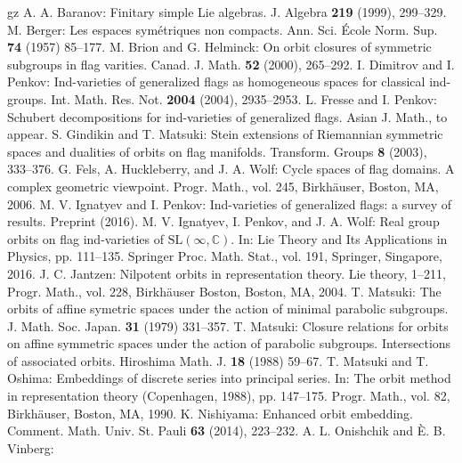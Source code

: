 \documentclass{amsart}
\theoremstyle{definition}
\begin{document}
\begin{thebibliography}{gz}
 A. A. Baranov: Finitary simple Lie algebras.  J. Algebra \textbf{219} (1999), 299--329.
 M. Berger: Les espaces sym\'etriques non compacts. Ann. Sci. \'Ecole Norm. Sup. \textbf{74} (1957) 85--177.
 M. Brion and G. Helminck: On orbit closures of symmetric subgroups in flag varities. Canad. J. Math. \textbf{52} (2000), 265--292.
 I. Dimitrov and I. Penkov: Ind-varieties of generalized flags as homogeneous spaces for classical ind-groups. Int. Math. Res. Not. \textbf{2004} (2004), 2935--2953.
 L. Fresse and I. Penkov: Schubert decompositions for ind-varieties of generalized flags. Asian J. Math., to appear.
 S. Gindikin and T. Matsuki: Stein extensions of Riemannian symmetric spaces and dualities of orbits on flag manifolds. Transform. Groups \textbf{8} (2003), 333--376.
 G. Fels, A. Huckleberry, and J. A. Wolf: Cycle spaces of flag domains. A complex geometric viewpoint. Progr. Math., vol. 245, Birkh\"auser, Boston, MA, 2006.
 M. V. Ignatyev and I. Penkov: Ind-varieties of generalized flags: a survey of results. Preprint (2016).
 M. V. Ignatyev, I. Penkov, and J. A. Wolf: Real group orbits on flag ind-varieties of $\mathrm{SL}(\infty,\mathbb{C})$. In: Lie Theory and Its Applications in Physics, pp. 111--135. Springer Proc. Math. Stat., vol. 191, Springer, Singapore, 2016.
  J. C. Jantzen: Nilpotent orbits in representation theory. Lie theory, 1--211, Progr. Math., vol. 228, Birkh\"auser Boston, Boston, MA, 2004. 
 T. Matsuki: The orbits of affine symetric spaces under the action of minimal parabolic
subgroups. J. Math. Soc. Japan. \textbf{31} (1979) 331--357.
 T. Matsuki: Closure relations for orbits on affine symmetric spaces under the action of parabolic subgroups. Intersections of associated orbits. Hiroshima Math. J. \textbf{18} (1988) 59--67.
 T. Matsuki and T. Oshima:
Embeddings of discrete series into principal series. 
In: The orbit method in representation theory (Copenhagen, 1988), pp. 147--175. 
Progr. Math., vol. 82, Birkh\"auser, Boston, MA, 1990. 
 K. Nishiyama: Enhanced orbit embedding.
Comment. Math. Univ. St. Pauli \textbf{63} (2014), 223--232. 
 A. L. Onishchik and \`E. B. Vinberg:

\end{thebibliography}
\end{document}

